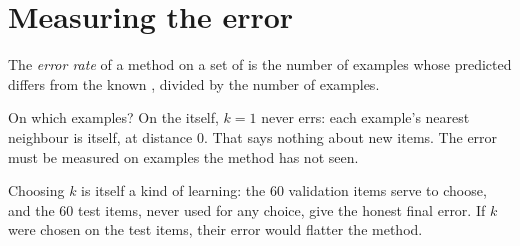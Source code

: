\section{Measuring the error}\label{sec:g11:k-nearest-neighbours:error}

\begin{definition}\label{def:g11:k-nearest-neighbours:error-rate}
The \emph{error rate} of a method on a set of  is the number of examples whose
predicted  differs from the known , divided by the number of examples.
\end{definition}

On which examples? On the  itself, $k = 1$ never errs: each example's nearest neighbour is itself, at
distance $0$. That says nothing about new items. The error must be measured on examples the method has not seen.

\label{lst:g11:k-nearest-neighbours:error-rate}

\label{out:g11:k-nearest-neighbours:error-rate}

Choosing $k$ is itself a kind of learning: the $60$ validation items serve to choose, and the $60$ test items, never
used for any choice, give the honest final error. If $k$ were chosen on the test items, their error would flatter
the method.

\label{lst:g11:k-nearest-neighbours:choose}

\label{out:g11:k-nearest-neighbours:choose}

